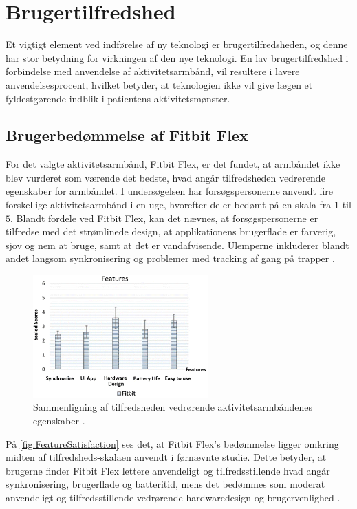 \section{Brugertilfredshed}

Et vigtigt element ved indførelse af ny teknologi er brugertilfredsheden, og denne har stor betydning for virkningen af den nye teknologi. En lav brugertilfredshed i forbindelse med anvendelse af aktivitetsarmbånd, vil resultere i lavere anvendelsesprocent, hvilket betyder, at teknologien ikke vil give lægen et fyldestgørende indblik i patientens aktivitetsmønster.

\subsection{Brugerbedømmelse af Fitbit Flex}

For det valgte aktivitetsarmbånd, Fitbit Flex, er det fundet, at armbåndet ikke blev vurderet som værende det bedste, hvad angår tilfredsheden vedrørende egenskaber for armbåndet. I undersøgelsen  har forsøgspersonerne anvendt fire forskellige aktivitetsarmbånd i en uge, hvorefter de er bedømt på en skala fra $1$ til $5$. Blandt fordele ved Fitbit Flex, kan det nævnes, at forsøgspersonerne er tilfredse med det strømlinede design, at applikationens brugerflade er farverig, sjov og nem at bruge, samt at det er vandafvisende. Ulemperne inkluderer blandt andet langsom synkronisering og problemer med tracking af gang på trapper \citep{kaewkannate2016}.

\begin{figure}[H]
	\centering
	\includegraphics[width=0.6\textwidth]{figures/FeatureSatisfaction2}
	\caption{Sammenligning af tilfredsheden vedrørende aktivitetsarmbåndenes egenskaber \citep{kaewkannate2016}.}
	\label{fig:FeatureSatisfaction}
\end{figure}

\noindent
På \autoref{fig:FeatureSatisfaction} ses det, at Fitbit Flex's bedømmelse ligger omkring midten af tilfredsheds-skalaen anvendt i førnævnte studie. Dette betyder, at brugerne finder Fitbit Flex lettere anvendeligt og tilfredsstillende hvad angår synkronisering, brugerflade og batteritid, mens det bedømmes som moderat anvendeligt og tilfredsstillende vedrørende hardwaredesign og brugervenlighed \citep{kaewkannate2016}.

